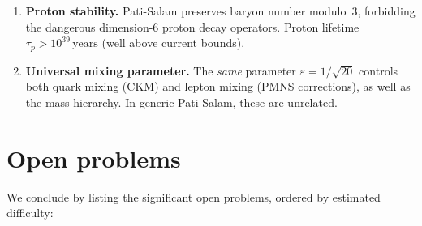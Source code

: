 \documentclass[12pt,a4paper]{article}
\theoremstyle{definition}
\begin{document}
\begin{enumerate}
\item \textbf{Proton stability.}
Pati-Salam preserves baryon number modulo~3, forbidding the dangerous dimension-6 proton decay operators.
Proton lifetime $\tau_p > 10^{39}\,\mathrm{years}$ (well above current bounds).

\item \textbf{Universal mixing parameter.}
The \emph{same} parameter $\varepsilon = 1/\sqrt{20}$ controls both quark mixing (CKM) and lepton mixing (PMNS corrections), as well as the mass hierarchy.
In generic Pati-Salam, these are unrelated.
\end{enumerate}


\section{Open problems}
\label{sec:open}

We conclude by listing the significant open problems, ordered by estimated difficulty:
\end{document}
